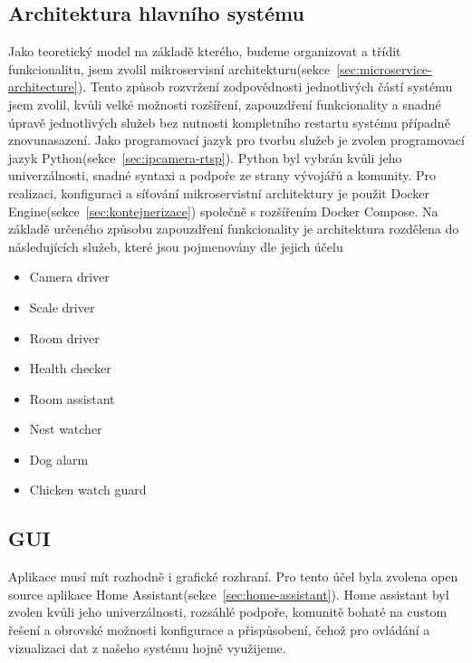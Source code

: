 \subsection{Architektura hlavního systému}\label{subsec:microservices}
Jako teoretický model na základě kterého, budeme organizovat a třídit funkcionalitu, jsem zvolil mikroservisní architekturu(sekce~\ref{sec:microservice-architecture}).
Tento způsob rozvržení zodpovědnosti jednotlivých částí systému jsem zvolil, kvůli velké možnosti rozšíření, zapouzdření funkcionality a snadné úpravě jednotlivých služeb bez nutnosti kompletního restartu systému případně znovunasazení.
Jako programovací jazyk pro tvorbu služeb je zvolen programovací jazyk Python(sekce~\ref{sec:ipcamera-rtsp}).
Python byl vybrán kvůli jeho univerzálnosti, snadné syntaxi a podpoře ze strany vývojářů a komunity.
Pro realizaci, konfiguraci a síťování mikroservistní architektury je použit Docker Engine(sekce~\ref{sec:kontejnerizace}) společně s rozšířením Docker Compose.
Na základě určeného způsobu zapouzdření funkcionality je architektura rozdělena do následujících služeb, které jsou pojmenovány dle jejich účelu
\begin{itemize}
    \item Camera driver
    \item Scale driver
    \item Room driver
    \item Health checker
    \item Room assistant
    \item Nest watcher
    \item Dog alarm
    \item Chicken watch guard
\end{itemize}

\subsection{GUI}\label{subsec:gui}
Aplikace musí mít rozhodně i grafické rozhraní.
Pro tento účel byla zvolena open source aplikace Home Assistant(sekce~\ref{sec:home-assistant}).
Home assistant byl zvolen kvůli jeho univerzálnosti, rozsáhlé podpoře, komunitě bohaté na custom řešení a obrovské možnosti konfigurace a přispůsobení, čehož pro ovládání a vizualizaci dat z našeho systému hojně využijeme.

